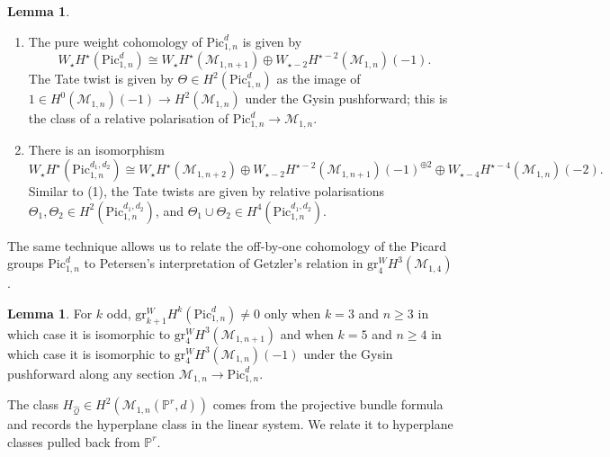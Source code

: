 \documentclass[12pt,reqno]{amsart}
\theoremstyle{definition}
\theoremstyle{definition}
\theoremstyle{definition}
\theoremstyle{definition}
\newtheorem{lemma}[theorem]{Lemma}
\begin{document}
\begin{lemma}\label{lem:pics}
  \begin{enumerate}
    \item  The pure weight cohomology of $\mathrm{Pic}^d_{1,n}$ is given by \[W_\star H^\star(\mathrm{Pic}^d_{1,n})\cong W_\star H^\star(\mathcal{M}_{1,n+1})\oplus W_{\star-2} H^{\star-2}(\mathcal{M}_{1,n})(-1).\] The Tate twist is given by $\Theta\in H^2(\mathrm{Pic}^d_{1,n})$ as the image of $1\in H^0(\mathcal{M}_{1,n})(-1)\to H^2(\mathcal{M}_{1,n})$ under the Gysin pushforward; this is the class of a relative polarisation of $\mathrm{Pic}^d_{1,n}\to \mathcal{M}_{1,n}.$
    \item  There is an isomorphism \[W_\star H^\star(\mathrm{Pic}^{d_1,d_2}_{1,n})\cong  W_\star H^\star(\mathcal{M}_{1,n+2})\oplus  W_{\star-2} H^{\star-2}(\mathcal{M}_{1,n+1})(-1)^{\oplus 2}\oplus W_{\star-4} H^{\star-4}(\mathcal{M}_{1,n})(-2).\] Similar to (1), the Tate twists are given by relative polarisations $\Theta_1, \Theta_2\in H^2(\mathrm{Pic}^{d_1,d_2}_{1,n})$, and $\Theta_1\cup \Theta_2\in H^4(\mathrm{Pic}^{d_1,d_2}_{1,n}).$
  \end{enumerate}
\end{lemma}

The same technique allows us to relate the off-by-one cohomology of the Picard groups $\mathrm{Pic}^d_{1,n}$ to Petersen's interpretation of Getzler's relation in $\mathrm{gr}^W_4 H^3(\mathcal{M}_{1,4})$ \cite{pet}.

\begin{lemma}\label{lem:M1noff}
  For $k$ odd, $\mathrm{gr}^W_{k+1}H^k(\mathrm{Pic}^d_{1,n})\neq 0$ only when $k = 3$ and $n\geq 3$ in which case it is isomorphic to $\mathrm{gr}^W_{4}H^3(\mathcal{M}_{1,n+1})$ and when $k=5$ and $n\geq 4$ in which case it is isomorphic to $\mathrm{gr}^W_{4}H^3(\mathcal{M}_{1,n})(-1)$ under the Gysin pushforward along any section $\mathcal{M}_{1,n}\to \mathrm{Pic}^d_{1,n}.$
\end{lemma}

The class $H_{\hat{\mathcal{Q}}}\in H^2(\mathcal{M}_{1,n}(\mathbb{P}^r,d))$ comes from the projective bundle formula and records the hyperplane class in the linear system. We relate it to hyperplane classes pulled back from $\mathbb{P}^r$. 
\end{document}
